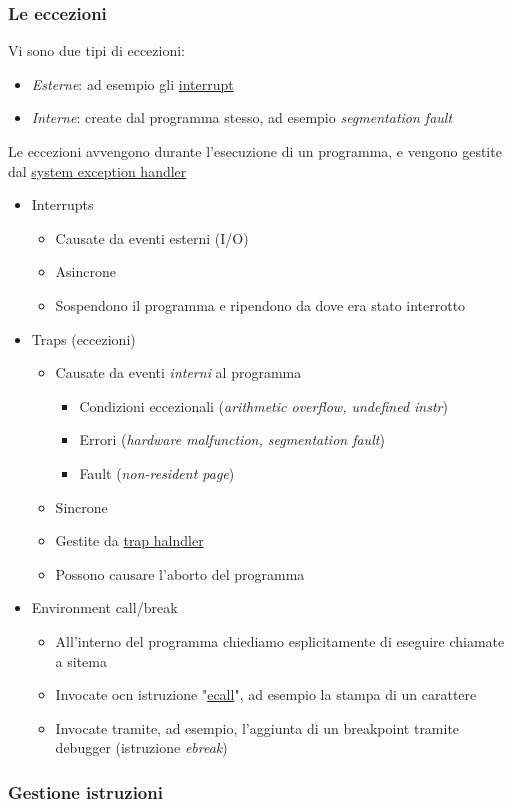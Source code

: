 \subsubsection*{Le eccezioni}
Vi sono due tipi di eccezioni:
\begin{itemize}
	\item \textit{Esterne}: ad esempio gli \underline{interrupt}
	\item \textit{Interne}: create dal programma stesso, ad esempio \textit{segmentation fault}
\end{itemize}
Le eccezioni avvengono durante l'esecuzione di un programma, e vengono gestite dal \underline{system exception handler}
\begin{itemize}
	\item Interrupts
	      \begin{itemize}
		      \item Causate da eventi esterni (I/O)
		      \item Asincrone
		      \item Sospendono il programma e ripendono da dove era stato interrotto
	      \end{itemize}
	\item Traps (eccezioni)
	      \begin{itemize}
		      \item Causate da eventi \textit{interni} al programma
		            \begin{itemize}
			            \item Condizioni eccezionali (\textit{arithmetic overflow, undefined instr})
			            \item Errori (\textit{hardware malfunction, segmentation fault})
			            \item Fault (\textit{non-resident page})
		            \end{itemize}
		      \item Sincrone
		      \item Gestite da \underline{trap halndler}
		      \item Possono causare l'aborto del programma
	      \end{itemize}
	\item Environment call/break
	      \begin{itemize}
		      \item All'interno del programma chiediamo esplicitamente di eseguire chiamate a sitema
		      \item Invocate ocn istruzione "\underline{ecall}", ad esempio la stampa di un carattere
		      \item Invocate tramite, ad esempio, l'aggiunta di un breakpoint tramite debugger (istruzione \textit{ebreak})
	      \end{itemize}
\end{itemize}
\subsubsection*{Gestione istruzioni}


